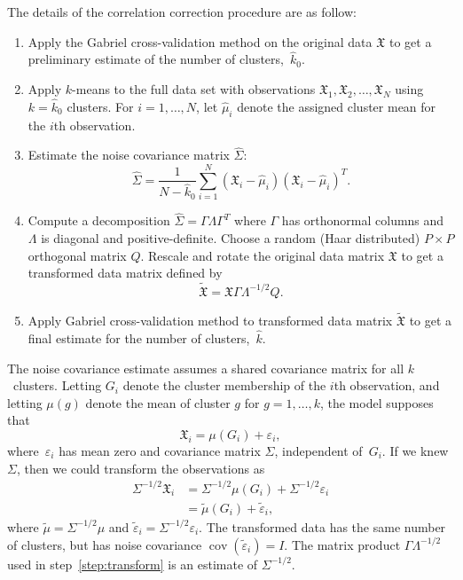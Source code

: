 \documentclass[12pt]{article}
\DeclareMathOperator*{\cov}{cov}
\newcommand{\T}{T}
\newcommand{\dataX}{\mathfrak{X}}
\begin{document}
The details of the correlation correction procedure are as follow:

\begin{enumerate}

  \item Apply the Gabriel cross-validation method on the original data
    $\dataX$ to get a preliminary estimate of the number of
    clusters,~$\hat k_0$.

  \item Apply $k$-means to the full data set with observations
    $\dataX_1, \dataX_2, \dotsc, \dataX_N$ using $k = \hat k_0$ clusters.
    For $i = 1, \dotsc, N$, let $\hat \mu_i$ denote the assigned cluster
    mean for the $i$th observation.

	\item Estimate the noise covariance matrix $\hat{\Sigma}$:
    \[
      \hat{\Sigma}
        =
        \frac{1}{N - \hat k_0}
        \sum^N_{i=1}
        (\dataX_i-\hat{\mu}_i)(\dataX_i-\hat{\mu}_i)^\T.
    \]

  \item \label{step:transform}
    Compute a decomposition $\hat{\Sigma} = \Gamma\Lambda\Gamma^\T$
    where $\Gamma$ has orthonormal columns and
    $\Lambda$ is diagonal and positive-definite.
    Choose a random (Haar distributed) $P \times P$ orthogonal matrix $Q$.
    Rescale and rotate the original data matrix $\dataX$ to get a
    transformed data matrix defined by
    \[
      \tilde{\dataX} = \dataX\Gamma\Lambda^{-1/2}Q.
    \]

  \item Apply Gabriel cross-validation method to transformed data matrix
    $\tilde{\dataX}$ to get a final estimate for the number of
    clusters,~$\hat k$. 

\end{enumerate}

The noise covariance estimate assumes a shared covariance matrix for all
$k$~clusters. Letting $G_i$ denote the cluster membership of the $i$th
observation, and letting $\mu(g)$ denote the mean of cluster $g$ for $g = 1,
\dotsc, k$, the model supposes that
\[
  \dataX_i = \mu(G_i)+\varepsilon_i,
\]
where~$\varepsilon_i$ has mean zero and covariance matrix $\Sigma$, independent
of~$G_i$. If we knew $\Sigma$, then we could transform the observations as
\begin{align*}
  \Sigma^{-1/2} \dataX_i
    &= \Sigma^{-1/2} \mu(G_i) + \Sigma^{-1/2} \varepsilon_i \\
    &= \tilde \mu(G_i) + \tilde \varepsilon_i,
\end{align*}
where $\tilde \mu = \Sigma^{-1/2} \mu$ and
$\tilde \varepsilon_i = \Sigma^{-1/2} \varepsilon_i$. The transformed data
has the same number of clusters, but has noise covariance
$\cov(\tilde \varepsilon_i) = I$. The matrix product $\Gamma \Lambda^{-1/2}$
used in step~\ref{step:transform} is an estimate of $\Sigma^{-1/2}$.
\end{document}
